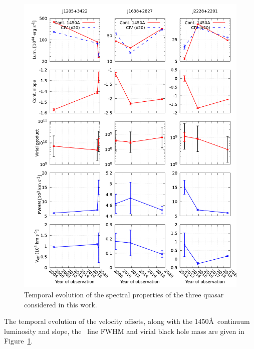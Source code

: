\documentclass[fleqn,usenatbib]{mnras}
\begin{document}
\begin{figure}
  \centering
  \includegraphics[width=\textwidth]{figures/QSFit-results}
  \vspace{-12pt}
  \caption{Temporal evolution of the spectral properties of the three
    quasar considered in this work.}
  \label{fig:QSFit-results}
\end{figure}
The temporal evolution of the velocity offsets, along with the
1450\AA\ continuum luminosity and slope, the \civ\ line FWHM
and virial black hole mass are given in Figure~\ref{fig:QSFit-results}.
\end{document}
